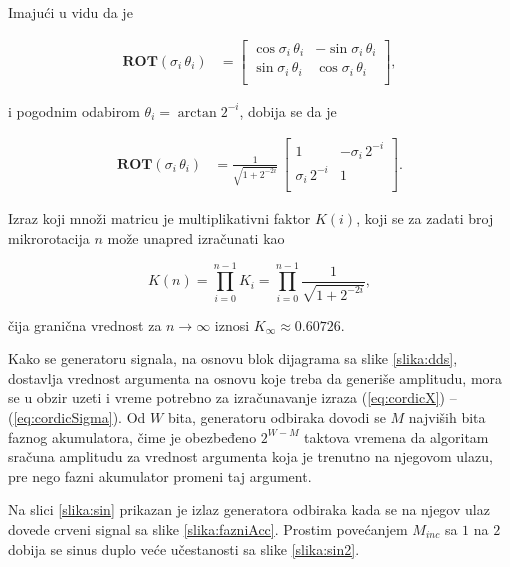 \documentclass[conference]{IEEEtran}
\begin{document}
Imajući u vidu da je

\begin{equation}
	\begin{split}
		\bm{ROT}(\sigma_i\,\theta_i) & = 
		\begin{bmatrix}
			\cos \sigma_i\,\theta_i & -\sin \sigma_i\,\theta_i \\
			\sin \sigma_i\,\theta_i & \cos \sigma_i\,\theta_i \\
		\end{bmatrix} ,
	\end{split}
\end{equation}

\noindent i pogodnim odabirom $\theta_i = \arctan 2^{-i}$, dobija se da je 

\begin{equation}
	\begin{split}
		\bm{ROT}(\sigma_i\,\theta_i) & = 
		\frac{1}{\sqrt{1+2^{-2i}}}\,
		\begin{bmatrix}
			1 & -\sigma_i\,2^{-i} 	\\
			\sigma_i\,2^{-i}	&	1 \\
		\end{bmatrix} .
	\end{split}
\end{equation}

Izraz koji množi matricu je multiplikativni faktor $K(i)$, koji se za zadati broj mikrorotacija $n$ može unapred izračunati kao

\begin{equation}\label{eq:Kinf}
K(n) = \prod_{i=0}^{n-1}{K_i} = \prod_{i=0}^{n-1}{\frac{1}{\sqrt{1+2^{-2i}}}},
\end{equation}

\noindent čija granična vrednost za $n\rightarrow \infty$ iznosi $K_{\infty}\approx 0.60726$. 

Kako se generatoru signala, na osnovu blok dijagrama sa slike \ref{slika:dds}, dostavlja vrednost argumenta na osnovu koje treba da generiše amplitudu, mora se u obzir uzeti i vreme potrebno za izračunavanje izraza (\ref{eq:cordicX}) -- (\ref{eq:cordicSigma}). Od $W$ bita, generatoru odbiraka dovodi se $M$ najviših bita faznog akumulatora, čime je obezbeđeno $2^{W-M}$ taktova vremena da algoritam sračuna amplitudu za vrednost argumenta koja je trenutno na njegovom ulazu, pre nego fazni akumulator promeni taj argument.

Na slici \ref{slika:sin} prikazan je izlaz generatora odbiraka kada se na njegov ulaz dovede crveni signal sa slike \ref{slika:fazniAcc}. Prostim povećanjem $M_{inc}$ sa $1$ na $2$ dobija se sinus duplo veće učestanosti sa slike \ref{slika:sin2}.
\end{document}
